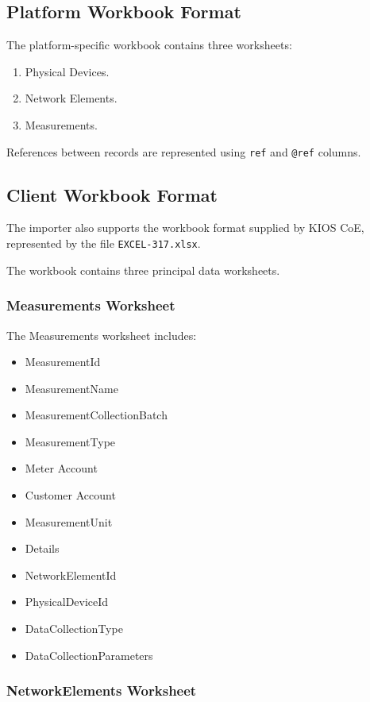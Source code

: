 \documentclass[11pt,a4paper]{article}
\begin{document}
\subsection{Platform Workbook Format}

The platform-specific workbook contains
three worksheets:

\begin{enumerate}
    \item Physical Devices.
    \item Network Elements.
    \item Measurements.
\end{enumerate}

References between records are represented
using \texttt{ref} and \texttt{@ref} columns.

\subsection{Client Workbook Format}

The importer also supports the workbook
format supplied by KIOS CoE, represented
by the file \texttt{EXCEL-317.xlsx}.

The workbook contains three principal
data worksheets.

\subsubsection{Measurements Worksheet}

The Measurements worksheet includes:

\begin{itemize}
    \item MeasurementId
    \item MeasurementName
    \item MeasurementCollectionBatch
    \item MeasurementType
    \item Meter Account
    \item Customer Account
    \item MeasurementUnit
    \item Details
    \item NetworkElementId
    \item PhysicalDeviceId
    \item DataCollectionType
    \item DataCollectionParameters
\end{itemize}

\subsubsection{NetworkElements Worksheet}
\end{document}
